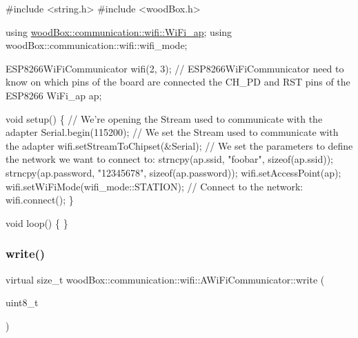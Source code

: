 \begin{DoxyCode}
\textcolor{preprocessor}{#include <string.h>}
\textcolor{preprocessor}{#include <woodBox.h>}

\textcolor{keyword}{using} \mbox{\hyperlink{structwood_box_1_1communication_1_1wifi_1_1s__wifi__access__point}{woodBox::communication::wifi::WiFi\_ap}};
\textcolor{keyword}{using} woodBox::communication::wifi::wifi\_mode;

ESP8266WiFiCommunicator wifi(2, 3); \textcolor{comment}{// ESP8266WiFiCommunicator need to know on which pins of the board are
       connected the CH\_PD and RST pins of the ESP8266}
WiFi\_ap ap;

\textcolor{keywordtype}{void} setup() \{
  \textcolor{comment}{// We're opening the Stream used to communicate with the adapter}
  Serial.begin(115200);
  \textcolor{comment}{// We set the Stream used to communicate with the adapter}
  wifi.setStreamToChipset(&Serial);
  \textcolor{comment}{// We set the parameters to define the network we want to connect to:}
  strncpy(ap.ssid, \textcolor{stringliteral}{"foobar"}, \textcolor{keyword}{sizeof}(ap.ssid));
  strncpy(ap.password, \textcolor{stringliteral}{"12345678"}, \textcolor{keyword}{sizeof}(ap.password));
  wifi.setAccessPoint(ap);
  wifi.setWiFiMode(wifi\_mode::STATION);
  \textcolor{comment}{// Connect to the network:}
  wifi.connect();
\}

\textcolor{keywordtype}{void} loop() \{
\}
\end{DoxyCode}
 \mbox{\label{classwood_box_1_1communication_1_1wifi_1_1_a_wi_fi_communicator_a7c40345fe59737b83bfee33ecb7be013}} 
\subsubsection{\texorpdfstring{write()}{write()}}
{\footnotesize\ttfamily virtual size\+\_\+t wood\+Box\+::communication\+::wifi\+::\+A\+Wi\+Fi\+Communicator\+::write (\begin{DoxyParamCaption}\item[{uint8\+\_\+t}]{ }\end{DoxyParamCaption})\hspace{0.3cm}{\ttfamily [pure virtual]}}

